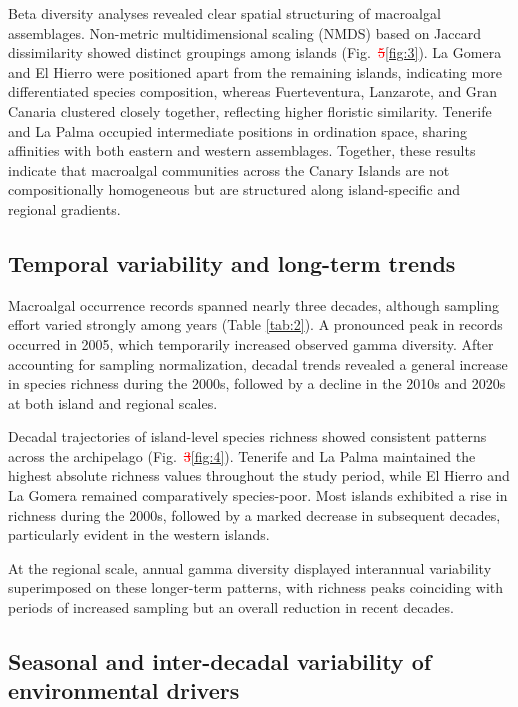 \documentclass[a4paper,fleqn]{cas-sc}
\DeclareRobustCommand{\deleted}[1]{\textcolor{red}{\sout{#1}}}
\DeclareRobustCommand{\added}[1]{\textcolor{blue}{#1}}
\begin{document}
Beta diversity analyses revealed clear spatial structuring of macroalgal assemblages. Non-metric multidimensional scaling (NMDS) based on Jaccard dissimilarity showed distinct groupings among islands (Fig.~\deleted{5}\added{\ref{fig:3}}). La Gomera and El Hierro were positioned apart from the remaining islands, indicating more differentiated species composition, whereas Fuerteventura, Lanzarote, and Gran Canaria clustered closely together, reflecting higher floristic similarity. Tenerife and La Palma occupied intermediate positions in ordination space, sharing affinities with both eastern and western assemblages. Together, these results indicate that macroalgal communities across the Canary Islands are not compositionally homogeneous but are structured along island-specific and regional gradients.

\subsection{Temporal variability and long-term trends}

Macroalgal occurrence records spanned nearly three decades, although sampling effort varied strongly among years (Table \ref{tab:2}). A pronounced peak in records occurred in 2005, which temporarily increased observed gamma diversity. After accounting for sampling normalization, decadal trends revealed a general increase in species richness during the 2000s, followed by a decline in the 2010s and 2020s at both island and regional scales.

Decadal trajectories of island-level species richness showed consistent patterns across the archipelago (Fig.~\deleted{3}\added{\ref{fig:4}}). Tenerife and La Palma maintained the highest absolute richness values throughout the study period, while El Hierro and La Gomera remained comparatively species-poor. Most islands exhibited a rise in richness during the 2000s, followed by a marked decrease in subsequent decades, particularly evident in the western islands.

At the regional scale, annual gamma diversity displayed interannual variability superimposed on these longer-term patterns, with richness peaks coinciding with periods of increased sampling but an overall reduction in recent decades.

\subsection{Seasonal and inter-decadal variability of environmental drivers}
\end{document}
